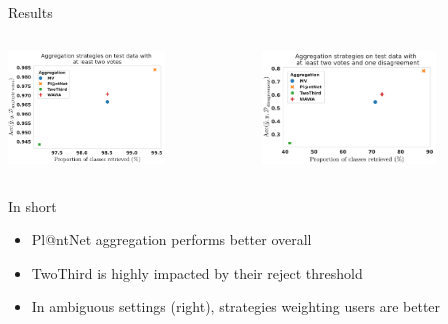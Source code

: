 \begin{frame}{Results}{}
    \centering
    \begin{columns}[c]
   \begin{column}{0.4\textwidth}
       \includegraphics[width=\linewidth, height=3cm]{./images/accuracy_by_vol_class_kept_two_votes__micro-5.pdf}
           \end{column}
   \begin{column}{0.4\textwidth}
       \label{fig:accuracy_vol_class_multiple}
       \includegraphics[width=\linewidth, height=3cm]{./images/accuracy_by_vol_class_kept_one_disagreeement__micro-5.pdf}
           \end{column}
 \end{columns}
 \pause
 \begin{block}{In short}
   \begin{itemize}
       \item Pl@ntNet aggregation performs better overall
       \item TwoThird is highly impacted by their reject threshold
       \item In ambiguous settings (right), strategies weighting users are better
   \end{itemize}
 \end{block}

\end{frame}

